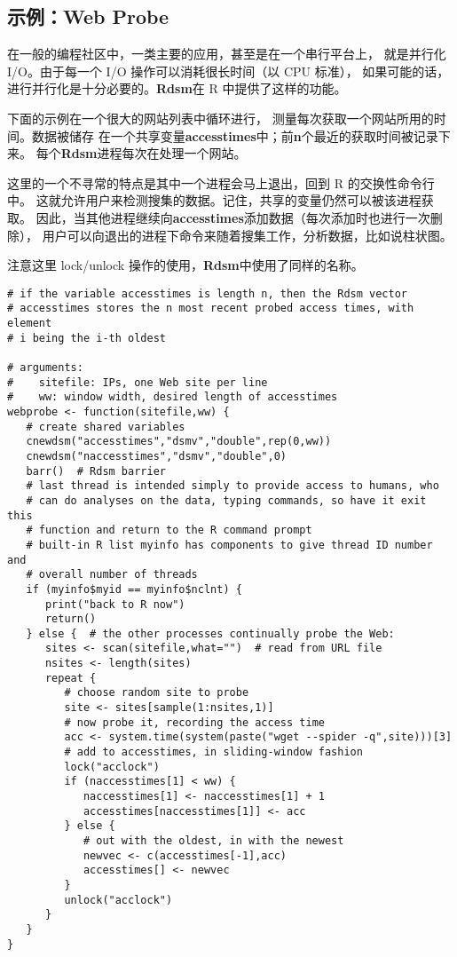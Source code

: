 \subsection{示例：Web Probe}

在一般的编程社区中，一类主要的应用，甚至是在一个串行平台上，
就是并行化 I/O。由于每一个 I/O 操作可以消耗很长时间（以 CPU 标准），
如果可能的话，进行并行化是十分必要的。{\bf Rdsm}在 R 中提供了这样的功能。

下面的示例在一个很大的网站列表中循环进行，
测量每次获取一个网站所用的时间。数据被储存
在一个共享变量{\bf accesstimes}中；前{\bf n}个最近的获取时间被记录下来。
每个{\bf Rdsm}进程每次在处理一个网站。

这里的一个不寻常的特点是其中一个进程会马上退出，回到 R 的交换性命令行中。
这就允许用户来检测搜集的数据。记住，共享的变量仍然可以被该进程获取。
因此，当其他进程继续向{\bf accesstimes}添加数据（每次添加时也进行一次删除），
用户可以向退出的进程下命令来随着搜集工作，分析数据，比如说柱状图。

注意这里 lock/unlock 操作的使用，{\bf Rdsm}中使用了同样的名称。

\begin{lstlisting}
# if the variable accesstimes is length n, then the Rdsm vector
# accesstimes stores the n most recent probed access times, with element
# i being the i-th oldest

# arguments:
#    sitefile: IPs, one Web site per line
#    ww: window width, desired length of accesstimes
webprobe <- function(sitefile,ww) {
   # create shared variables
   cnewdsm("accesstimes","dsmv","double",rep(0,ww))
   cnewdsm("naccesstimes","dsmv","double",0)
   barr()  # Rdsm barrier
   # last thread is intended simply to provide access to humans, who
   # can do analyses on the data, typing commands, so have it exit this
   # function and return to the R command prompt
   # built-in R list myinfo has components to give thread ID number and
   # overall number of threads
   if (myinfo$myid == myinfo$nclnt) {
      print("back to R now")
      return()
   } else {  # the other processes continually probe the Web:
      sites <- scan(sitefile,what="")  # read from URL file
      nsites <- length(sites)
      repeat {
         # choose random site to probe
         site <- sites[sample(1:nsites,1)]
         # now probe it, recording the access time
         acc <- system.time(system(paste("wget --spider -q",site)))[3]
         # add to accesstimes, in sliding-window fashion
         lock("acclock")
         if (naccesstimes[1] < ww) {
            naccesstimes[1] <- naccesstimes[1] + 1
            accesstimes[naccesstimes[1]] <- acc
         } else {
            # out with the oldest, in with the newest
            newvec <- c(accesstimes[-1],acc)
            accesstimes[] <- newvec
         }
         unlock("acclock")
      }
   }
}
\end{lstlisting}


